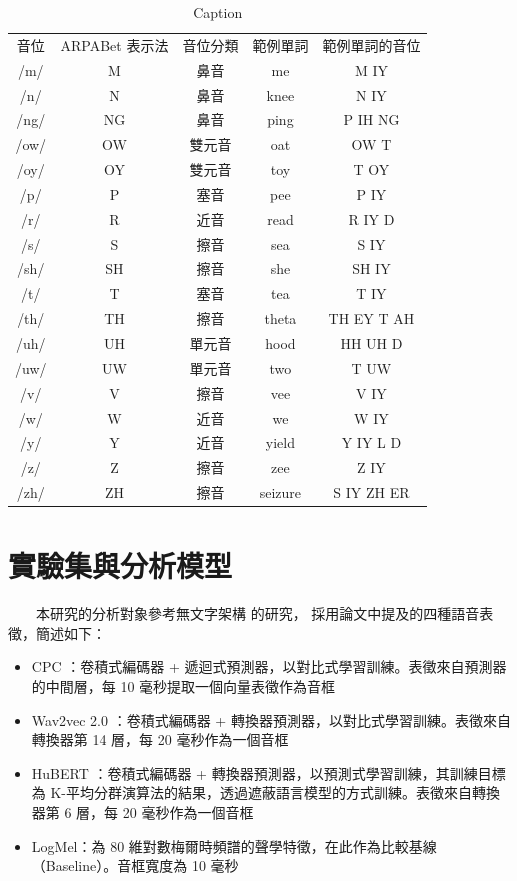 {\begin{table}
    \centering
    \begin{tabular}{ccccc}
        音位 & ARPABet 表示法 & 音位分類 & 範例單詞 & 範例單詞的音位\\
/m/  & M  & 鼻音 & me & M IY \\
/n/  & N  & 鼻音 & knee &    N IY \\
/ng/ & NG & 鼻音 & ping &    P IH NG \\
/ow/ & OW & 雙元音 & oat &     OW T \\
/oy/ & OY & 雙元音 & toy &     T OY \\
/p/  & P  & 塞音 & pee &     P IY \\
/r/  & R  & 近音 & read &    R IY D \\
/s/  & S  & 擦音 & sea &     S IY \\
/sh/ & SH & 擦音 & she &     SH IY \\
/t/  & T  & 塞音 & tea &     T IY \\
/th/ & TH & 擦音 & theta &   TH EY T AH \\
/uh/ & UH & 單元音 & hood &    HH UH D \\
/uw/ & UW & 單元音 & two &     T UW \\
/v/  & V  & 擦音 & vee &     V IY \\
/w/  & W  & 近音 & we & W IY \\
/y/  & Y  & 近音 & yield &   Y IY L D \\
/z/  & Z  & 擦音 & zee &     Z IY \\
/zh/ & ZH & 擦音 & seizure & S IY ZH ER \\

    \end{tabular}
    \caption{Caption}
    \label{tab:ipa2}
\end{table}

\section{實驗集與分析模型}

　　本研究的分析對象參考無文字架構 \cite{noauthor_textless_2021, lakhotia_generative_2021, lakhotia_generative_2021-1} 的研究，
採用論文中提及的四種語音表徵，簡述如下：

\begin{itemize}
    \item CPC \cite{rivière2020unsupervised}：卷積式編碼器 + 遞迴式預測器，以對比式學習訓練。表徵來自預測器的中間層，每 10 毫秒提取一個向量表徵作為音框
    \item Wav2vec 2.0 \cite{baevski2020wav2vec}：卷積式編碼器 + 轉換器預測器，以對比式學習訓練。表徵來自轉換器第 14 層，每 20 毫秒作為一個音框
    \item HuBERT \cite{hsu_hubert_2021-2}：卷積式編碼器 + 轉換器預測器，以預測式學習訓練，其訓練目標為 K-平均分群演算法的結果，透過遮蔽語言模型的方式訓練。表徵來自轉換器第 6 層，每 20 毫秒作為一個音框
    \item LogMel：為 80 維對數梅爾時頻譜的聲學特徵，在此作為比較基線（Baseline）。音框寬度為 10 毫秒
\end{itemize}

}
